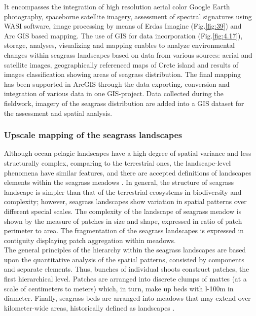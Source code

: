 \documentclass[10pt, a4paper]{article}
\begin{document}
It encompasses the integration of
high resolution aerial color Google Earth photography, spaceborne satellite imagery, assessment of
spectral signatures using WASI software, image processing by means of Erdas Imagine (Fig.\ref{fig:39}) and Arc GIS
based mapping. The use of GIS for data incorporation (Fig.\ref{fig:4.17}), storage, analyses, visualizing and mapping
enables to analyze environmental changes within seagrass landscapes based on data from various
sources: aerial and satellite images, geographically referenced maps of Crete island and results of
images classification showing areas of seagrass distribution.
The final mapping has been supported in ArcGIS through the data exporting, conversion and
integration of various data in one GIS-project. Data collected during the fieldwork, imagery
of the seagrass distribution are added into a GIS dataset for the assessment and spatial analysis.

\subsubsection{Upscale mapping of the seagrass landscapes}
Although ocean pelagic landscapes have a high degree of spatial variance and less structurally
complex, comparing to the terrestrial ones, the landscape-level phenomena have similar features, and
there are accepted definitions of landscapes elements within the seagrass meadows \cite{Robbins94}\label{Robbins94}. 
In general, the structure of seagrass landscape is simpler than that of the terrestrial
ecosystems in biodiversity and complexity; however, seagrass landscapes show variation in spatial
patterns over different special scales. The complexity of the landscape of seagrass meadow is shown by the
measure of patches in size and shape, expressed in ratio of patch perimeter to area. The fragmentation
of the seagrass landscapes is expressed in contiguity displaying patch aggregation within meadows.\\
The general principles of the hierarchy within the seagrass landscapes are based upon the quantitative
analysis of the spatial patterns, consisted by components and separate elements. Thus, bunches of
individual shoots construct patches, the first hierarchical level. Patches are arranged into discrete
clumps of mattes (at a scale of centimeters to meters) which, in turn, make up beds with l-100m in
diameter. Finally, seagrass beds are arranged into meadows that may extend over kilometer-wide
areas, historically defined as landscapes \cite{Robbins94}\label{Robbins94}.
\end{document}
